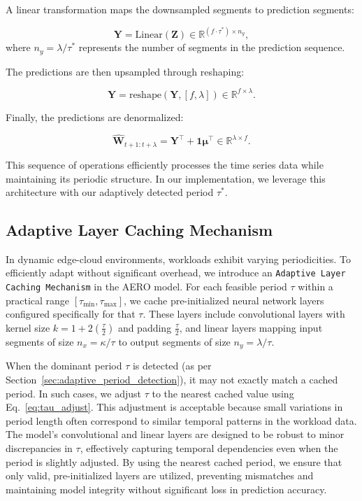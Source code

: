 \documentclass{ieeetmlcn}
\begin{document}
A linear transformation maps the downsampled segments to prediction segments:

\begin{equation}
\label{eq:linear_mapping}
\mathbf{Y} = \text{Linear}\left( \mathbf{Z} \right) \in \mathbb{R}^{(f \cdot \tau^{\ast}) \times n_y},
\end{equation}
where $n_y = \lambda / \tau^{\ast}$ represents the number of segments in the prediction sequence.

The predictions are then upsampled through reshaping:

\begin{equation}
\label{eq:upsampling}
\mathbf{Y} = \text{reshape}\left( \mathbf{Y},  \left[ f,  \lambda \right] \right) \in \mathbb{R}^{f \times \lambda}.
\end{equation}

Finally, the predictions are denormalized:

\begin{equation}
\label{eq:denormalization}
\hat{\mathbf{W}}_{t+1:t+\lambda} = \mathbf{Y}^\top + \mathbf{1} \boldsymbol{\mu}^\top \in \mathbb{R}^{\lambda \times f}.
\end{equation}

This sequence of operations efficiently processes the time series data while maintaining its periodic structure. In our implementation, we leverage this architecture with our adaptively detected period $\tau^{\ast}$.


\subsection{Adaptive Layer Caching Mechanism}
\label{sec:adaptive_layer_caching}

{\color{blue}
In dynamic edge-cloud environments, workloads exhibit varying periodicities. To efficiently adapt without significant overhead, we introduce an \texttt{Adaptive Layer Caching Mechanism} in the AERO model. For each feasible period $\tau$ within a practical range $[\tau_{\min}, \tau_{\max}]$, we cache pre-initialized neural network layers configured specifically for that $\tau$. These layers include convolutional layers with kernel size $k = 1 + 2\left( \frac{\tau}{2} \right)$ and padding $\frac{\tau}{2}$, and linear layers mapping input segments of size $n_x = \kappa / \tau$ to output segments of size $n_y = \lambda / \tau$.

When the dominant period $\tau$ is detected (as per Section~\ref{sec:adaptive_period_detection}), it may not exactly match a cached period. In such cases, we adjust $\tau$ to the nearest cached value using Eq.~\eqref{eq:tau_adjust}. This adjustment is acceptable because small variations in period length often correspond to similar temporal patterns in the workload data. The model's convolutional and linear layers are designed to be robust to minor discrepancies in $\tau$, effectively capturing temporal dependencies even when the period is slightly adjusted. By using the nearest cached period, we ensure that only valid, pre-initialized layers are utilized, preventing mismatches and maintaining model integrity without significant loss in prediction accuracy.
}
\end{document}
